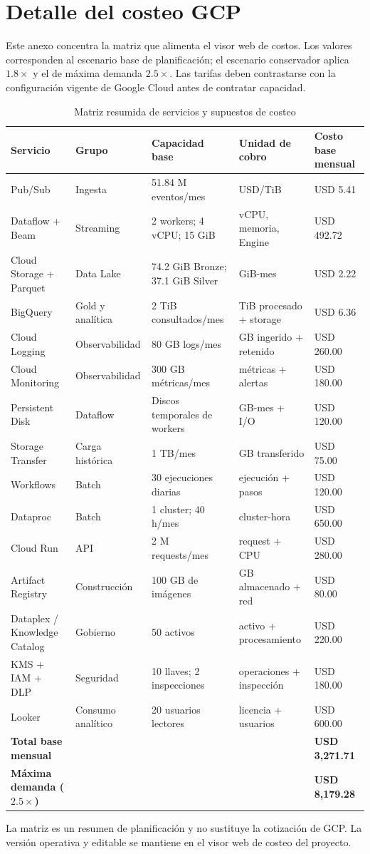 \documentclass[11pt,a4paper]{article}
\newcommand{\Seccion}[1]{\FloatBarrier\Needspace{5\baselineskip}\section{#1}}
\begin{document}
\clearpage
\Seccion{Detalle del costeo GCP}\label{anexo:costeo}
Este anexo concentra la matriz que alimenta el visor web de costos. Los valores corresponden al escenario base de planificación; el escenario conservador aplica $1.8\times$ y el de máxima demanda $2.5\times$. Las tarifas deben contrastarse con la configuración vigente de Google Cloud antes de contratar capacidad.
\begin{table}[H]
\caption{Matriz resumida de servicios y supuestos de costeo}\label{tab:detalle-costeo-gcp}
\scriptsize
\begin{tabularx}{\linewidth}{@{}P{.22\linewidth}P{.18\linewidth}P{.25\linewidth}P{.18\linewidth}Y@{}}\toprule
Servicio & Grupo & Capacidad base & Unidad de cobro & Costo base mensual\\\midrule
Pub/Sub & Ingesta & 51.84 M eventos/mes & USD/TiB & USD 5.41\\
Dataflow + Beam & Streaming & 2 workers; 4 vCPU; 15 GiB & vCPU, memoria, Engine & USD 492.72\\
Cloud Storage + Parquet & Data Lake & 74.2 GiB Bronze; 37.1 GiB Silver & GiB-mes & USD 2.22\\
BigQuery & Gold y analítica & 2 TiB consultados/mes & TiB procesado + storage & USD 6.36\\
Cloud Logging & Observabilidad & 80 GB logs/mes & GB ingerido + retenido & USD 260.00\\
Cloud Monitoring & Observabilidad & 300 GB métricas/mes & métricas + alertas & USD 180.00\\
Persistent Disk & Dataflow & Discos temporales de workers & GB-mes + I/O & USD 120.00\\
Storage Transfer & Carga histórica & 1 TB/mes & GB transferido & USD 75.00\\
Workflows & Batch & 30 ejecuciones diarias & ejecución + pasos & USD 120.00\\
Dataproc & Batch & 1 cluster; 40 h/mes & cluster-hora & USD 650.00\\
Cloud Run & API & 2 M requests/mes & request + CPU & USD 280.00\\
Artifact Registry & Construcción & 100 GB de imágenes & GB almacenado + red & USD 80.00\\
Dataplex / Knowledge Catalog & Gobierno & 50 activos & activo + procesamiento & USD 220.00\\
KMS + IAM + DLP & Seguridad & 10 llaves; 2 inspecciones & operaciones + inspección & USD 180.00\\
Looker & Consumo analítico & 20 usuarios lectores & licencia + usuarios & USD 600.00\\\midrule
\textbf{Total base mensual} & & & & \textbf{USD 3,271.71}\\
\textbf{Máxima demanda ($2.5\times$)} & & & & \textbf{USD 8,179.28}\\\bottomrule
\end{tabularx}
\end{table}
La matriz es un resumen de planificación y no sustituye la cotización de GCP. La versión operativa y editable se mantiene en el visor web de costeo del proyecto.
\end{document}
